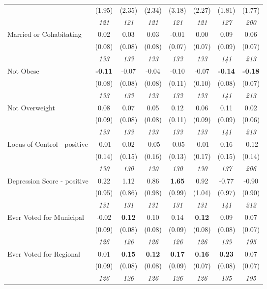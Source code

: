 \begin{tabular}{l c c c c c c c}
& (1.95) & (2.35) & (2.34) & (3.18) & (2.27) & (1.81) & (1.77) \\
& \textit{ 121 } & \textit{ 121 } & \textit{ 121 } & \textit{ 121 } & \textit{ 121 } & \textit{ 127 } & \textit{ 200 } \\
Married or Cohabitating & 0.02 & 0.03 & 0.03 & -0.01 & 0.00 & 0.09 & 0.06 \\
& (0.08) & (0.08) & (0.08) & (0.07) & (0.07) & (0.09) & (0.07) \\
& \textit{ 133 } & \textit{ 133 } & \textit{ 133 } & \textit{ 133 } & \textit{ 133 } & \textit{ 141 } & \textit{ 213 } \\
Not Obese & \textbf{ -0.11 } & -0.07 & -0.04 & -0.10 & -0.07 & \textbf{-0.14} & \textbf{-0.18} \\
& (0.08) & (0.08) & (0.08) & (0.11) & (0.10) & (0.08) & (0.07) \\
& \textit{ 133 } & \textit{ 133 } & \textit{ 133 } & \textit{ 133 } & \textit{ 133 } & \textit{ 141 } & \textit{ 213 } \\
Not Overweight & 0.08 & 0.07 & 0.05 & 0.12 & 0.06 & 0.11 & 0.02 \\
& (0.09) & (0.08) & (0.08) & (0.11) & (0.09) & (0.09) & (0.06) \\
& \textit{ 133 } & \textit{ 133 } & \textit{ 133 } & \textit{ 133 } & \textit{ 133 } & \textit{ 141 } & \textit{ 213 } \\
Locus of Control - positive & -0.01 & 0.02 & -0.05 & -0.05 & -0.01 & 0.16 & -0.12 \\
& (0.14) & (0.15) & (0.16) & (0.13) & (0.17) & (0.15) & (0.14) \\
& \textit{ 130 } & \textit{ 130 } & \textit{ 130 } & \textit{ 130 } & \textit{ 130 } & \textit{ 137 } & \textit{ 206 } \\
Depression Score - positive & 0.22 & 1.12 & 0.86 & \textbf{1.65} & 0.92 & -0.77 & -0.90 \\
& (0.95) & (0.86) & (0.98) & (0.99) & (1.04) & (0.97) & (0.90) \\
& \textit{ 131 } & \textit{ 131 } & \textit{ 131 } & \textit{ 131 } & \textit{ 131 } & \textit{ 141 } & \textit{ 212 } \\
Ever Voted for Municipal & -0.02 & \textbf{ 0.12 } & 0.10 & 0.14 & \textbf{0.12} & 0.09 & 0.07 \\
& (0.09) & (0.08) & (0.08) & (0.09) & (0.08) & (0.08) & (0.07) \\
& \textit{ 126 } & \textit{ 126 } & \textit{ 126 } & \textit{ 126 } & \textit{ 126 } & \textit{ 135 } & \textit{ 195 } \\
Ever Voted for Regional & 0.01 & \textbf{ 0.15 } & \textbf{ 0.12 } & \textbf{0.17} & \textbf{0.16} & \textbf{0.23} & 0.07 \\
& (0.09) & (0.08) & (0.08) & (0.09) & (0.07) & (0.08) & (0.07) \\
& \textit{ 126 } & \textit{ 126 } & \textit{ 126 } & \textit{ 126 } & \textit{ 126 } & \textit{ 135 } & \textit{ 195 } \\
\bottomrule
\end{tabular}
